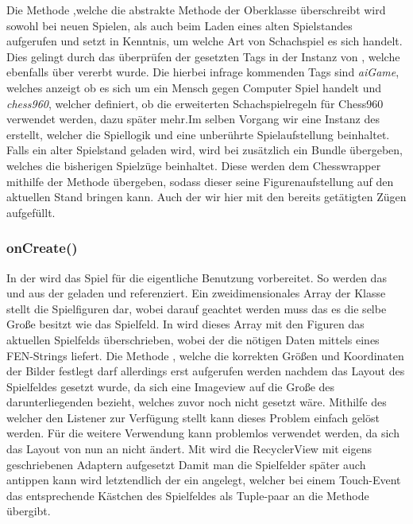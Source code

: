 Die Methode ,welche die abstrakte Methode der Oberklasse
 überschreibt wird sowohl bei neuen Spielen, als auch beim
Laden eines alten Spielstandes aufgerufen und setzt in Kenntnis, um welche Art
von Schachspiel es sich handelt. Dies gelingt durch das überprüfen der gesetzten
Tags in der Instanz von , welche ebenfalls über 
vererbt wurde. Die hierbei infrage kommenden Tags sind \emph{aiGame}, welches
anzeigt ob es sich um ein Mensch gegen Computer Spiel handelt und
\emph{chess960}, welcher definiert, ob die erweiterten Schachspielregeln für
Chess960 verwendet werden, dazu später mehr.\newline Im selben Vorgang wir eine
Instanz des  erstellt, welcher die Spiellogik und eine
unberührte Spielaufstellung beinhaltet. Falls ein alter Spielstand geladen wird,
wird bei  zusätzlich ein Bundle übergeben, welches die
bisherigen Spielzüge beinhaltet. Diese werden dem Chesswrapper mithilfe der
Methode  übergeben, sodass dieser seine Figurenaufstellung auf
den aktuellen Stand bringen kann. Auch der  wir hier
mit den bereits getätigten Zügen aufgefüllt.

\subsubsection{onCreate()}
In der  wird das Spiel für die eigentliche Benutzung 
vorbereitet. So werden das  und  
aus der  geladen und referenziert. Ein zweidimensionales Array 
der Klasse  stellt die Spielfiguren dar, wobei darauf geachtet 
werden muss das es die selbe Große besitzt wie das Spielfeld. In 
 wird dieses Array mit den Figuren das aktuellen 
Spielfelds überschrieben, wobei der  die nötigen Daten 
mittels eines FEN-Strings liefert. Die Methode , welche die 
korrekten Größen und Koordinaten der Bilder festlegt darf allerdings erst 
aufgerufen werden nachdem das Layout des Spielfeldes gesetzt wurde, da sich eine 
Imageview auf die Große des darunterliegenden  bezieht, welches zuvor 
noch nicht gesetzt wäre. Mithilfe des  welcher den 
Listener  zur Verfügung stellt kann dieses 
Problem einfach gelöst werden. Für die weitere Verwendung kann 
 problemlos verwendet werden, da sich das Layout von nun an 
nicht ändert. Mit  wird die RecyclerView mit eigens 
geschriebenen Adaptern aufgesetzt\newline
Damit man die Spielfelder später auch antippen kann wird letztendlich der 
 ein  angelegt, welcher bei 
einem Touch-Event das entsprechende Kästchen des Spielfeldes als Tuple-paar an 
die Methode  übergibt.

